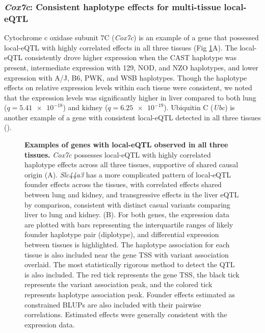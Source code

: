 \documentclass[10pt,letterpaper]{article}
\begin{document}
\subsubsection*{\textit{Cox7c}: Consistent haplotype effects for multi-tissue local-eQTL}
Cytochrome c oxidase subunit 7C (\textit{Cox7c}) is an example of a gene that possessed local-eQTL with highly correlated effects in all three tissues (Fig \ref{fig:correlated_local_eqtl}A).
The local-eQTL consistently drove higher expression when the CAST haplotype was present, intermediate expression with 129, NOD, and NZO haplotypes, and lower expression with A/J, B6, PWK, and WSB haplotypes. Though the haplotype effects on relative expression levels within each tissue were consistent, we noted that the expression levels was significantly higher in liver compared to both lung ($q = \num{5.41e-18}$) and kidney ($q = \num{6.25e-19}$). Ubiquitin C (\textit{Ubc}) is another example of a gene with consistent local-eQTL detected in all three tissues ().

\begin{figure}[h!]
\caption{\textbf{Examples of genes with local-eQTL observed in all three tissues.} 
\textit{Cox7c} possesses local-eQTL with highly correlated haplotype effects across all three tissues, supportive of shared causal origin (A). \textit{Slc44a3} has a more complicated pattern of local-eQTL founder effects across the tissues, with correlated effects shared between lung and kidney, and transgressive effects in the liver eQTL by comparison, consistent with distinct casual variants comparing liver to lung and kidney. (B). For both genes, the expression data are plotted with bars representing the interquartile ranges of likely founder haplotype pair (diplotype), and differential expression between tissues is highlighted. The haplotype association for each tissue is also included near the gene TSS with variant association overlaid. The most statistically rigorous method to detect the QTL is also included. The red tick represents the gene TSS, the black tick represents the variant association peak, and the colored tick represents haplotype association peak. Founder effects estimated as constrained BLUPs are also included with their pairwise correlations. Estimated effects were generally consistent with the expression data.
\label{fig:correlated_local_eqtl}}
\end{figure}
\end{document}

